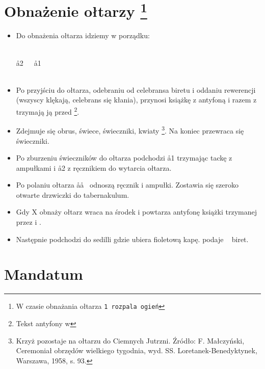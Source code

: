 \section{Obnażenie ołtarzy \protect\footnote{W czasie obnażania ołtarza \tt1
        rozpala ogień}}

\begin{itemize}
      \item Do obnażenia ołtarza idziemy w porządku:
            \begin{center}
                  \uparrow \smallskip\\
                  \aa2~~~\aa1 \smallskip\\
                  ~~~ \smallskip\\
                  \ii
            \end{center}
      \item Po przyjściu do ołtarza, odebraniu od celebransa biretu i oddaniu
            rewerencji (wszyscy klękają, celebrans się kłania),  przynosi
            książkę z antyfoną i razem z  trzymają ją przed \ii
            \footnote{Tekst antyfony w }.
      \item Zdejmuje się obrus, świece, świeczniki, kwiaty \footnote{Krzyż
                  pozostaje na ołtarzu do Ciemnych Jutrzni. Źródło: F. Małczyński,
                  Ceremoniał obrzędów wielkiego tygodnia, wyd. SS.
                  Loretanek-Benedyktynek, Warszawa, 1958, s. 93.}. Na koniec przewraca
            się świeczniki.
      \item Po zburzeniu świeczników do ołtarza podchodzi \aa1 trzymając tackę z
            ampułkami i \aa2 z ręcznikiem do wytarcia ołtarza.
      \item Po polaniu ołtarza \aa\aa~ odnoszą ręcznik i ampułki. Zostawia się
            szeroko otwarte drzwiczki do tabernakulum.
      \item Gdy X obnaży ołtarz wraca na środek i powtarza antyfonę książki
            trzymanej przez  i .
      \item Następnie podchodzi do sedilli gdzie ubiera fioletową kapę. 
            podaje \ii~ biret.
\end{itemize}

\section{Mandatum}


